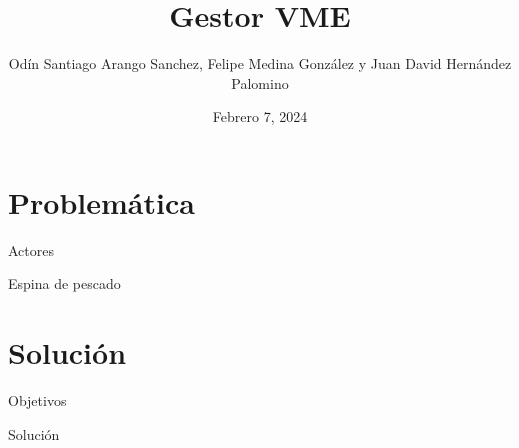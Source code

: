 \documentclass{beamer}
\title{Gestor VME}
\institute[Colombia]{Universidad Central}
\date{Febrero 7, 2024}
\author{Odín Santiago Arango Sanchez,
Felipe Medina González y
Juan David Hernández Palomino}
\begin{document}
\begin{frame}
  \titlepage
\end{frame}
\section{Problemática}
\begin{frame}{Actores}
    
\end{frame}
\begin{frame}{Espina de pescado}

\end{frame}
\section{Solución}
\begin{frame}{Objetivos}
    
\end{frame}
\begin{frame}{Solución}
    
\end{frame}
\end{document}
